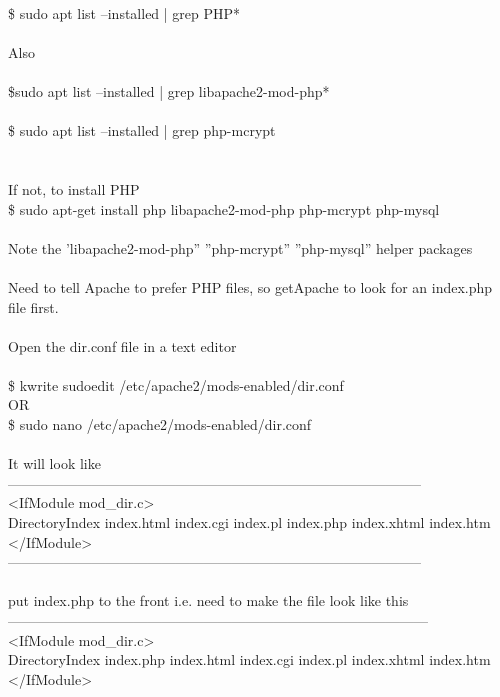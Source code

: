 \documentclass[10pt,a4paper]{article}
\begin{document}
{{{{{{{{{{{{{{{{{{\\
\$ sudo apt list --installed | grep  PHP*\\
\\
Also\\
\\
\$sudo apt list --installed | grep  libapache2-mod-php*\\
\\
\$ sudo apt list --installed | grep php-mcrypt\\
\\
\\
If not, to install PHP\\
\$ sudo apt-get install php libapache2-mod-php php-mcrypt php-mysql\\
\\
Note the 'libapache2-mod-php''  ''php-mcrypt''   ''php-mysql''  helper packages\\
\\
Need to tell Apache to prefer PHP files, so getApache to look for an index.php file first.\\
\\
Open the dir.conf file in a text editor\\
\\
\$ kwrite sudoedit /etc/apache2/mods-enabled/dir.conf}{\large \\
OR\\
\$ sudo nano /etc/apache2/mods-enabled/dir.conf}{\large \\
\\
It will look like\\
-----------------------------------------------------------------------------------------\\
<IfModule mod\_dir.c>\\
    DirectoryIndex index.html index.cgi index.pl index.php index.xhtml index.htm\\
</IfModule>\\
-----------------------------------------------------------------------------------------\\
\\
put index.php to the front i.e. need to make the file look like this\\
------------------------------------------------------------------------------------------\\
<IfModule mod\_dir.c>\\
    DirectoryIndex index.php index.html index.cgi index.pl index.xhtml index.htm\\
</IfModule>\\
}}}}}}}}}}}}}}}}}}
\end{document}
